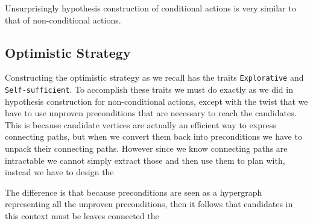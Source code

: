 \documentclass[../Master.tex]{subfiles}
\begin{document}
\providecommand{\master}{..}

Unsurprisingly hypothesis construction of conditional actions is very similar to that of non-conditional actions. 


\subsection{Optimistic Strategy}
Constructing the optimistic strategy as we recall has the traits \texttt{Explorative} and \texttt{Self-sufficient}.
To accomplish these traits we must do exactly as we did in hypothesis construction for non-conditional actions, 
except with the twist that we have to use unproven preconditions that are necessary to reach the candidates.
This is because candidate vertices are actually an efficient way to express connecting paths, 
but when we convert them back into preconditions we have to unpack their connecting paths.
However since we know connecting paths are intractable we cannot simply extract those and then use them to plan with, instead we have to design the  


The difference is that because preconditions are seen as a hypergraph representing all the unproven preconditions, 
then it follows that candidates in this context must be leaves connected the  

  

  
\end{document}
